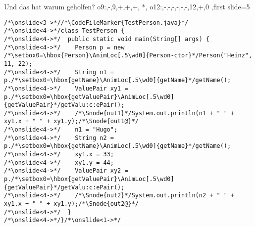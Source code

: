 {\begin{frame}[fragile,t]{Und das hat warum geholfen?}
{{    o9:{},-,9,+,+,+,
    *,
    o12:{},-,-,-,-,-,-,12,+,0
},first slide=5}
\begin{verbatim}
/*\onslide<3->*//*\CodeFileMarker{TestPerson.java}*/
/*\onslide<4->*/class TestPerson {
/*\onslide<4->*/  public static void main(String[] args) {
/*\onslide<4->*/    Person p = new /*\setbox0=\hbox{Person}\AnimLoc[.5\wd0]{Person-ctor}*/Person("Heinz", 11, 22);
/*\onslide<4->*/    String n1 = p./*\setbox0=\hbox{getName}\AnimLoc[.5\wd0]{getName}*/getName();
/*\onslide<4->*/    ValuePair xy1 = p./*\setbox0=\hbox{getValuePair}\AnimLoc[.5\wd0]{getValuePair}*/getValu:c:ePair();
/*\onslide<4->*/    /*\Snode{out1}*/System.out.println(n1 + " " + xy1.x + " " + xy1.y);/*\Snode{out1@}*/
/*\onslide<4->*/    n1 = "Hugo";
/*\onslide<4->*/    String n2 = p./*\setbox0=\hbox{getName}\AnimLoc[.5\wd0]{getName}*/getName();
/*\onslide<4->*/    xy1.x = 33;
/*\onslide<4->*/    xy1.y = 44;
/*\onslide<4->*/    ValuePair xy2 = p./*\setbox0=\hbox{getValuePair}\AnimLoc[.5\wd0]{getValuePair}*/getValu:c:ePair();
/*\onslide<4->*/    /*\Snode{out2}*/System.out.println(n2 + " " + xy1.x + " " + xy1.y);/*\Snode{out2@}*/
/*\onslide<4->*/  }
/*\onslide<4->*/}/*\onslide<1->*/
\end{verbatim}
\endAnimateCode{}
\endcolumns%
\end{frame}}
